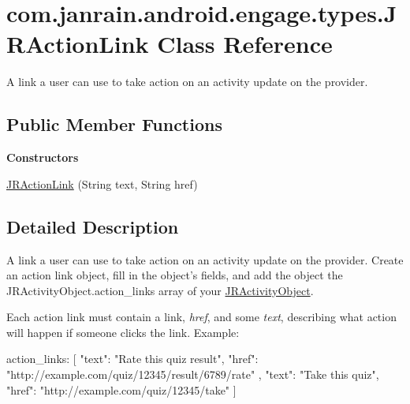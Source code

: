 \hypertarget{classcom_1_1janrain_1_1android_1_1engage_1_1types_1_1_j_r_action_link}{
\section{com.janrain.android.engage.types.JRActionLink Class Reference}
\label{classcom_1_1janrain_1_1android_1_1engage_1_1types_1_1_j_r_action_link}
}


A link a user can use to take action on an activity update on the provider.  


\subsection*{Public Member Functions}
\begin{Indent}{\bf Constructors}\par
{\em \label{_amgrp559a25fdb98a7d1fd1c3771ac568d5e9}
 }\begin{DoxyCompactItemize}
\item 
\hyperlink{classcom_1_1janrain_1_1android_1_1engage_1_1types_1_1_j_r_action_link_a4a5c9c01ed02d9234ccae5ad402cd10e}{JRActionLink} (String text, String href)
\end{DoxyCompactItemize}
\end{Indent}


\subsection{Detailed Description}
A link a user can use to take action on an activity update on the provider. Create an action link object, fill in the object's fields, and add the object the JRActivityObject.action\_\-links array of your \hyperlink{classcom_1_1janrain_1_1android_1_1engage_1_1types_1_1_j_r_activity_object}{JRActivityObject}.

Each action link must contain a link, {\itshape href\/}, and some {\itshape text\/}, describing what action will happen if someone clicks the link. Example: 
\begin{DoxyCode}
 action_links:
 [
   {
     "text": "Rate this quiz result",
     "href": "http://example.com/quiz/12345/result/6789/rate"
   },
   {
     "text": "Take this quiz",
     "href": "http://example.com/quiz/12345/take"
   }
 ]
\end{DoxyCode}
 

